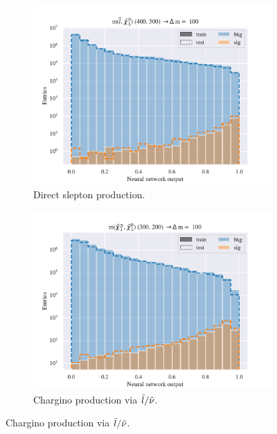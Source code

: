 \begin{figure}[H]
    \centering
    \begin{subfigure}[t!]{0.49\textwidth}
        \includegraphics[width = \textwidth]{Figures/SlepSlep/ML/NN/All_level/Low/scaled_train_test_395984.pdf}
        \caption{Direct slepton production.}
        \label{fig:SlepslepNNLow}
    \end{subfigure}
    \begin{subfigure}[t!]{0.49\textwidth}
        \includegraphics[width = \textwidth]{Figures/SlepSnu/NN/All_level/Low/scaled_train_test_397115.pdf}
        \caption{Chargino production via $\Tilde{l}/\Tilde{\nu}$.}
        \label{fig:SlepsnuNNLow}
    \end{subfigure}    

\end{figure}
